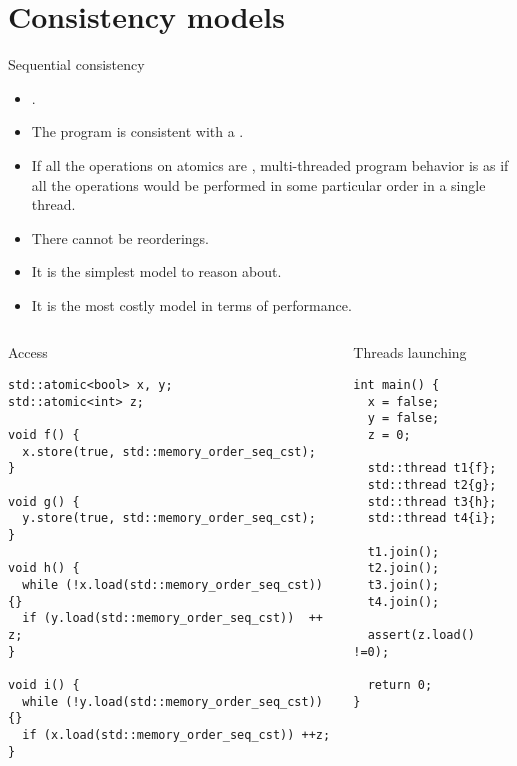 \section{Consistency models}

\begin{frame}[t]{Sequential consistency}
\begin{itemize}
  \item {}.
  \item The program is consistent with a .
  \item If all the operations on atomics are , 
        multi-threaded program behavior is as if all the operations would be
        performed in some particular order in a single thread.
  \item There cannot be reorderings.
  \item It is the simplest model to reason about.
  \item It is the most costly model in terms of performance.
\end{itemize}
\end{frame}

\begin{frame}[fragile]
\begin{columns}

\begin{column}{.6\textwidth}
\begin{block}{Access}
\begin{lstlisting}[basicstyle=\tiny]
std::atomic<bool> x, y;
std::atomic<int> z;

void f() {
  x.store(true, std::memory_order_seq_cst);
}

void g() {
  y.store(true, std::memory_order_seq_cst);
}

void h() {
  while (!x.load(std::memory_order_seq_cst)) {}
  if (y.load(std::memory_order_seq_cst))  ++ z;
}

void i() {
  while (!y.load(std::memory_order_seq_cst)) {}
  if (x.load(std::memory_order_seq_cst)) ++z;
}
\end{lstlisting}
\end{block}
\end{column}

\pause

\begin{column}{.4\textwidth}
\begin{block}{Threads launching}
\begin{lstlisting}[basicstyle=\tiny]
int main() {
  x = false;
  y = false;
  z = 0;

  std::thread t1{f};
  std::thread t2{g};
  std::thread t3{h};
  std::thread t4{i};

  t1.join();
  t2.join();
  t3.join();
  t4.join();

  assert(z.load() !=0);

  return 0;
}
\end{lstlisting}
\end{block}
\end{column}

\end{columns}
\end{frame}

